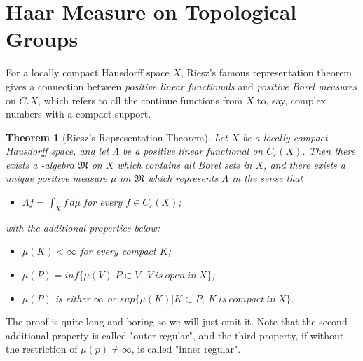 \documentclass[12pt,a4paper]{article}
\newtheorem{thm}{Theorem}
\begin{document}
\section{Haar Measure on Topological Groups}
For a locally compact Hausdorff space $X$, Riesz's famous representation theorem gives a connection between \emph{positive linear functionals} and \emph{positive Borel measures} on $C_c{X}$, which refers to all the continue functions from $X$ to, say, complex numbers with a compact support.
\begin{thm}[Riesz's Representation Theorem]
    Let $X$ be a locally compact Hausdorff space, and let $\Lambda$ be a positive linear functional on $C_c(X)$. Then there exists a \sigma-algebra $\mathfrak{M}$ on $X$ which contains all Borel sets in $X$, and there exists a unique positive measure $\mu$ on $\mathfrak{M}$ which represents $\Lambda$ in the sense that 
    \begin{itemize}
        \item $\Lambda f=\int_X f\,d\mu$ for every $f\in C_c(X)$;
    \end{itemize}
with the additional properties below:
    \begin{itemize}
        \item $\mu(K)<\infty$ for every compact $K$;
        \item $\mu(P)=inf\{\mu(V)|P\subset V,\ V\ is\ open\ in\ X\}$;
        \item $\mu(P)$ is either $\infty$ or $sup\{\mu(K)|K\subset P,\ K\ is\ compact\ in\ X\}$.
    \end{itemize}
\end{thm}
The proof is quite long and boring so we will just omit it. Note that the second additional property is called "outer regular", and the third property, if without the restriction of $\mu(p)\not=\infty$, is called "inner regular".
\end{document}
